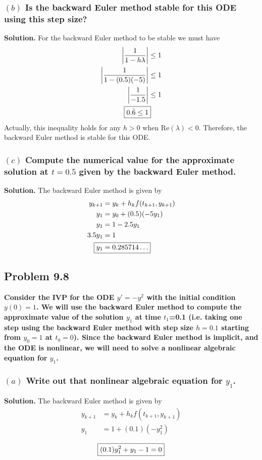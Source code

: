 \subsubsection*{$(b)$ Is the backward Euler method stable for this ODE using this step size?}
\textbf{Solution.} For the backward Euler method to be stable we must have
\begin{align*}
\left|\frac{1}{1-h\lambda}\right| &\leq 1\\
\left|\frac{1}{1-(0.5)(-5)}\right| &\leq 1\\
\left|\frac{1}{-1.5}\right| &\leq 1\\
\Aboxed{0.\bar{6} \leq 1}
\end{align*}
Actually, this inequality holds for any $h>0$ when $\text{Re}(\lambda)<0$. Therefore, the backward Euler method is stable for this ODE.

\subsubsection*{$(c)$ Compute the numerical value for the approximate solution at $t=0.5$ given by the backward Euler method.}
\textbf{Solution.} The backward Euler method is given by
\begin{align*}
y_{k+1} &= y_k + h_kf(t_{k+1},y_{k+1})\\
y_1 &= y_0 + (0.5)(-5y_1)\\
y_1 &= 1 - 2.5y_1\\
3.5y_1 &= 1\\
\Aboxed{y_1 &= 0.285714\ldots}
\end{align*}

\subsection{Problem 9.8}
\textbf{Consider the IVP for the ODE $y'=-y^2$ with the initial condition $y(0)=1$. We will use the backward Euler method to compute the approximate value of the solution $y_1$ at time $t_1$=0.1 (i.e. taking one step using the backward Euler method with step size $h=0.1$ starting from $y_0=1$ at $t_0=0$). Since the backward Euler method is implicit, and the ODE is nonlinear, we will need to solve a nonlinear algebraic equation for $y_1$.}
\subsubsection*{$(a)$ Write out that nonlinear algebraic equation for $y_1$.}
\textbf{Solution.} The backward Euler method is given by
\begin{align*}
y_{k+1} &= y_k + h_kf(t_{k+1},y_{k+1})\\
y_1 &= 1 + (0.1)(-y_1^2)\\
\end{align*}
\begin{equation}\label{quad}
\boxed{(0.1)y_1^2 + y_1 - 1 = 0}\\
\end{equation}

